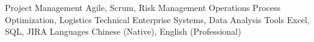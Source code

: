 
\begin{cvskills}
  \cvskill
    {Project Management}
    {\textbullet\enskip Agile, Scrum, Risk Management} %
  \cvskill
    {Operations}
    {\textbullet\enskip Process Optimization, Logistics}
  \cvskill
    {Technical}
    {\textbullet\enskip Enterprise Systems, Data Analysis}
  \cvskill
    {Tools}
    {\textbullet\enskip Excel, SQL, JIRA}
  \cvskill
    {Languages}
    {\textbullet\enskip Chinese (Native), English (Professional)}
\end{cvskills}